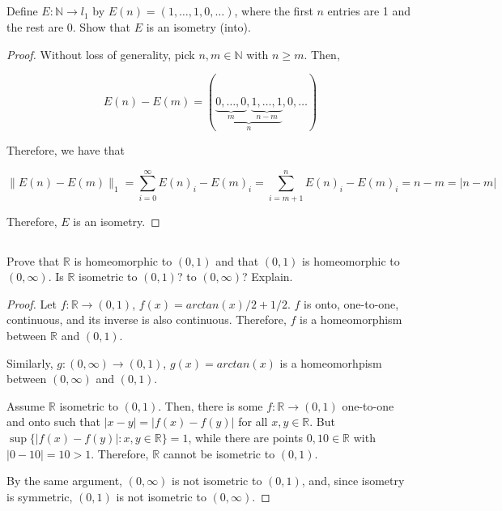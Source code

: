
\subsection{} Define $E : \mathbb{N} \rightarrow l_1$ by $E(n) = (1, \dots, 1, 0, \dots )$, where the first $n$ entries are 1 and the rest are 0. Show that $E$ is an isometry (into).

\begin{proof}

Without loss of generality, pick $n,m \in \mathbb{N}$ with $n \geq m$. Then,

$$ E(n) - E(m) = (\underbrace{\underbrace{0, \dots, 0}_{m}, \underbrace{1, \dots, 1}_{n-m}}_{n}, 0, \dots)  $$

Therefore, we have that

$$ \|E(n) - E(m)\|_1 = \sum_{i=0}^\infty E(n)_i - E(m)_i = \sum_{i=m+1}^n E(n)_i - E(m)_i = n-m = |n-m| $$

Therefore, $E$ is an isometry.

\end{proof}

\subsection{} Prove that $\mathbb{R}$ is homeomorphic to $(0,  1)$ and that $(0, 1)$ is homeomorphic to $(0, \infty)$. Is $\mathbb{R}$ isometric to $(0, 1)$? to $(0, \infty)$? Explain. 

\begin{proof}
Let $f: \mathbb{R} \rightarrow (0,1)$, $f(x) = arctan(x)/2 + 1/2$. $f$ is onto, one-to-one, continuous,  and its inverse is also continuous. Therefore, $f$ is a homeomorphism between $\mathbb{R}$ and $(0,1)$.

Similarly, $g: (0, \infty) \rightarrow (0,1)$, $g(x)=arctan(x)$ is a homeomorhpism between $(0,\infty)$ and $(0,1)$.

\vspace{1em}

Assume $\mathbb{R}$ isometric to $(0, 1)$. Then, there is some $f: \mathbb{R} \rightarrow (0,1)$ one-to-one and onto such that $|x-y| = |f(x) - f(y)|$ for all $x,y \in \mathbb{R}$. But $\sup\{|f(x) - f(y)| : x,y \in \mathbb{R}\} = 1$, while there are points $0,10 \in \mathbb{R}$ with $|0 - 10| = 10 > 1$. Therefore, $\mathbb{R}$ cannot be isometric to $(0, 1)$.

By the same argument, $(0, \infty)$ is not isometric to $(0,1)$, and, since isometry is symmetric, $(0,1)$ is not isometric to $(0,\infty)$.

\end{proof}


